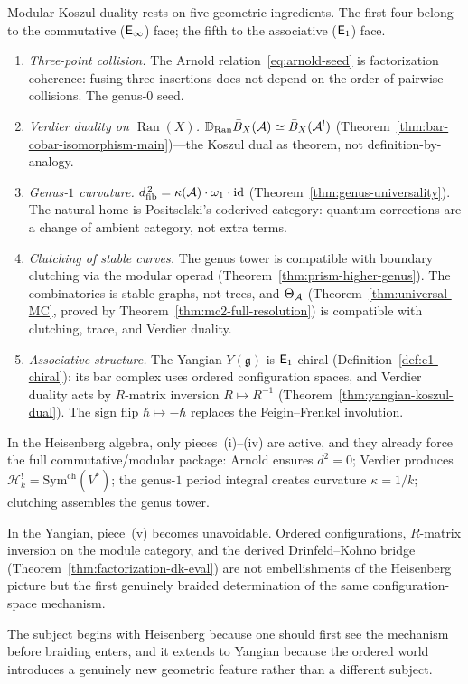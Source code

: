 \begin{remark}\label{rem:five-pieces}
Modular Koszul duality rests on five geometric ingredients.
The first four belong to the commutative ($\mathsf{E}_{\infty}$) face; the fifth
to the associative ($\mathsf{E}_1$) face.
\begin{enumerate}[label=\textup{(\roman*)}]
\item \emph{Three-point collision.}
  The Arnold relation~\eqref{eq:arnold-seed} is factorization
  coherence: fusing three insertions does not depend on the
  order of pairwise collisions.  The genus-$0$ seed.
\item \emph{Verdier duality on $\operatorname{Ran}(X)$.}
  $\mathbb{D}_{\operatorname{Ran}} \bar{B}_X(\mathcal{A}) \simeq
  \bar{B}_X(\mathcal{A}^!)$
  (Theorem~\ref{thm:bar-cobar-isomorphism-main})---the
  Koszul dual as theorem, not definition-by-analogy.
\item \emph{Genus-$1$ curvature.}
  $d_{\mathrm{fib}}^{\,2} = \kappa(\mathcal{A}) \cdot \omega_1 \cdot
  \operatorname{id}$
  (Theorem~\ref{thm:genus-universality}).  The natural home is
  Positselski's coderived category: quantum corrections are a
  change of ambient category, not extra terms.
\item \emph{Clutching of stable curves.}
  The genus tower is compatible with boundary clutching via the
  modular operad (Theorem~\ref{thm:prism-higher-genus}).
  The combinatorics is stable graphs, not trees, and
  $\Theta_{\mathcal{A}}$ (Theorem~\ref{thm:universal-MC},
  proved by Theorem~\ref{thm:mc2-full-resolution})
  is compatible with clutching, trace, and Verdier duality.
\item \emph{Associative structure.}
  The Yangian $Y(\mathfrak{g})$ is $\mathsf{E}_1$-chiral
  (Definition~\ref{def:e1-chiral}): its bar complex uses ordered
  configuration spaces, and Verdier duality acts by $R$-matrix
  inversion $R \mapsto R^{-1}$
  (Theorem~\ref{thm:yangian-koszul-dual}).
  The sign flip $\hbar \mapsto -\hbar$ replaces the Feigin--Frenkel
  involution.
\end{enumerate}

\smallskip\noindent
In the Heisenberg algebra, only pieces~(i)--(iv) are active, and they
already force the full commutative/modular package: Arnold ensures
$d^2 = 0$; Verdier produces
$\mathcal{H}_k^! = \mathrm{Sym}^{\mathrm{ch}}(V^*)$; the genus-$1$
period integral creates curvature $\kappa = 1/k$; clutching assembles
the genus tower.

\smallskip\noindent
In the Yangian, piece~(v) becomes unavoidable.  Ordered
configurations, $R$-matrix inversion on the module category, and the
derived Drinfeld--Kohno bridge
(Theorem~\ref{thm:factorization-dk-eval}) are not embellishments of
the Heisenberg picture but the first genuinely braided determination of
the same configuration-space mechanism.

\smallskip\noindent
The subject begins with Heisenberg because one should first see the
mechanism before braiding enters, and it extends to Yangian because the
ordered world introduces a genuinely new geometric feature rather than
a different subject.
\end{remark}

